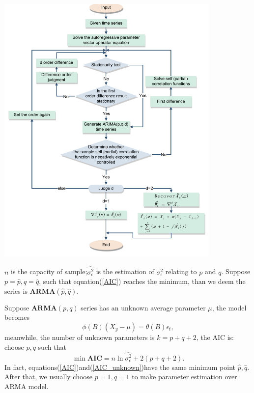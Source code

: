 \documentclass{mcmthesis}
\numberwithin{figure}{section}
\numberwithin{table}{section}
\numberwithin{equation}{section}
\begin{document}
\begin{minipage}[htbp]{0.55\linewidth}
  \begin{flushleft}
    \includegraphics[width =11cm]{codes/ARIMA_裁剪页面.pdf}
  \end{flushleft}
\end{minipage}
\par
$ n $ is the capacity of sample;$ \hat{\sigma_\epsilon^2} $ is the
estimation of $ \sigma_\epsilon^2 $ relating to $ p $ and $ q $.
Suppose $ p = \hat{p}, q = \hat{q} $, such that equation(\ref{AIC}) reaches the minimum,
than we deem the series is $ \mathbf{ARMA}(\hat{p},\hat{q}) $. 
\par
Suppose $ \mathbf{ARMA}(p,q) $ series has an unknown average parameter $ \mu $,
the model becomes
$$
  \phi(B)(X_y-\mu) = \theta(B)\epsilon_t,
$$   
meanwhile, the number of unknown parameters is $ k = p+q+2 $, the AIC is:
choose $ p,q $ such that
\begin{equation}\label{AIC_unknown}
  \min \mathbf{AIC} = n\ln\hat{\sigma_\epsilon^2}+2(p+q+2).
\end{equation}  
In fact, equations(\ref{AIC})and(\ref{AIC_unknown})have the same minimum point $ \hat{p},\hat{q} $.
After that, we usually choose $ p = 1, q = 1 $ to make parameter estimation 
over ARMA model.
\end{document}
